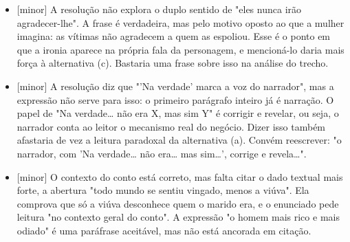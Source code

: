 \documentclass{article}%
\begin{document}
\begin{itemize}%
\item%
{[}minor{]} A resolução não explora o duplo sentido de "eles nunca irão agradecer{-}lhe". A frase é verdadeira, mas pelo motivo oposto ao que a mulher imagina: as vítimas não agradecem a quem as espoliou. Esse é o ponto em que a ironia aparece na própria fala da personagem, e mencioná{-}lo daria mais força à alternativa (c). Bastaria uma frase sobre isso na análise do trecho.%
\item%
{[}minor{]} A resolução diz que "'Na verdade' marca a voz do narrador", mas a expressão não serve para isso: o primeiro parágrafo inteiro já é narração. O papel de "Na verdade\ldots{} não era X, mas sim Y" é corrigir e revelar, ou seja, o narrador conta ao leitor o mecanismo real do negócio. Dizer isso também afastaria de vez a leitura paradoxal da alternativa (a). Convém reescrever: "o narrador, com 'Na verdade\ldots{} não era\ldots{} mas sim\ldots{}', corrige e revela\ldots{}".%
\item%
{[}minor{]} O contexto do conto está correto, mas falta citar o dado textual mais forte, a abertura "todo mundo se sentiu vingado, menos a viúva". Ela comprova que só a viúva desconhece quem o marido era, e o enunciado pede leitura "no contexto geral do conto". A expressão "o homem mais rico e mais odiado" é uma paráfrase aceitável, mas não está ancorada em citação.%
\end{itemize}%
\end{document}
